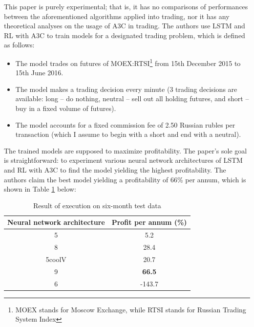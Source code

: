 \documentclass[12pt, letterpaper, oneside]{article}
\begin{document}
This paper is purely experimental; that is, it has no comparisons of performances between the aforementioned algorithms applied into trading, nor it has any theoretical analyses on the usage of A3C in trading. The authors use LSTM and RL with A3C to train models for a designated trading problem, which is defined as follows:
\begin{itemize}
    \item The model trades on futures of MOEX:RTSI\footnote{MOEX stands for Moscow Exchange, while RTSI stands for Russian Trading System Index} from 15th December 2015 to 15th June 2016.
    \item The model makes a trading decision every minute (3 trading decisions are available: long -- do nothing, neutral -- sell out all holding futures, and short -- buy in a fixed volume of futures).
    \item The model accounts for a fixed commission fee of 2.50 Russian rubles per transaction (which I assume to begin with a short and end with a neutral).
\end{itemize}
The trained models are supposed to maximize profitability. The paper's sole goal is straightforward: to experiment various neural network architectures of LSTM and RL with A3C to find the model yielding the highest profitability. The authors claim the best model yielding a profitability of 66\% per annum, which is shown in Table \ref{table:data} below:

\begin{table}[h!]
    \centering
    \begin{tabular}{ |c|c| }
        \hline
        Neural network architecture & Profit per annum (\%) \\ [0.5ex]
        \hline
        5 & 5.2 \\
        8 & 28.4 \\
        5coolV & 20.7 \\
        9 & \textbf{66.5} \\
        6 & -143.7 \\ [0.5ex]
        \hline
    \end{tabular}
    \caption{Result of execution on six-month test data}
    \label{table:data}
\end{table}
\end{document}

